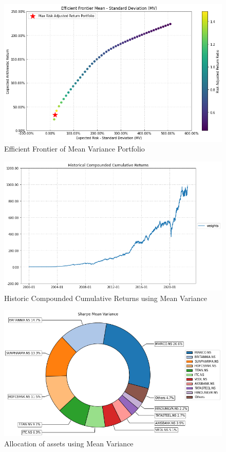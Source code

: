 \begin{figure}[H]
\centering
   \includegraphics[width=1.0\textwidth]{MV/EF.png}
      \caption{Efficient Frontier of Mean Variance Portfolio}
       \label{MV_EF}
\end{figure}
\begin{figure}[H]
\centering
   \includegraphics[width=1.0\textwidth]{MV/Historic.png}
      \caption{Historic Compounded Cumulative Returns using Mean Variance}
       \label{MV_HCCR}
\end{figure}

\begin{figure}[H]
\centering
   \includegraphics[width=1.0\textwidth]{MV/Allocation.png}
      \caption{Allocation of assets using Mean Variance}
       \label{MV_Alloc}
\end{figure}

